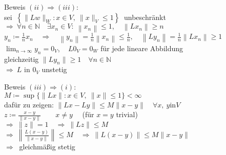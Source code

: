 \documentclass[AERbeamer%
,optBeamerClassicFormat%
,optLeftEquations   %
]{AERlatex}
\begin{document}
%
    \begin{frame}{Beweis}
        \setlength{\baselineskip}{1.6\baselineskip}
%
        $(ii) \Rightarrow (iii)$: \\ \pause
        sei $ ~\left\{\|L w\|_W: x \in V, ~ \|x \|_V \leq 1\right\} ~$ unbeschränkt \\ \pause
        $\Rightarrow ~ \forall n \in \mathbb{N} \quad \exists x_n \in V: ~ \left\|x_n\right\| \leq 1, \quad \left\|L x_n\right\| \geq n$ \\ \pause
        $y_n \coloneqq \frac{1}{n} x_n \quad \Rightarrow \quad \left\|y_n\right\|=\frac{1}{n}\left\|x_n\right\| \leq \frac{1}{n}, \quad \left\|L y_n\right\|=\frac{1}{n}\left\|L x_n\right\| \geq 1$ \\ \pause
        $\lim _{n \rightarrow \infty} y_n=0_V$, ~ $L 0_V=0_W$ für jede lineare Abbildung \\
        gleichzeitig $\|Ly_n\| \geq 1 \quad \forall n \in \mathbb{N}$ \\
        $\Rightarrow ~ L$ in $0_V$ unstetig
    \end{frame}
%
    \begin{frame}{Beweis}
        \setlength{\baselineskip}{1.6\baselineskip}
%
        $(iii) \Rightarrow (i)$: \\
        $M\coloneqq\sup \{\|L x\|: x \in V,~\|x\| \leq 1\}<\infty$ \\ \pause
        dafür zu zeigen: $\|L x-L y\| \leq M\|x-y\| \quad \forall x, ~ y \text{in} V$ \\ \pause
        $z\coloneqq\frac{x-y}{\|x-y\|} \qquad x \neq y \quad$ (für $x=y$ trivial) \\ \pause
        $\Rightarrow ~\|z\|=1 \quad \Rightarrow ~\|L z\| \leq M$ \\ \pause
        $\Rightarrow ~\left\|\frac{L(x-y)}{\|x-y\|}\right\| \leq M \quad \Rightarrow ~\|L(x-y)\| \leq M\|x-y\|$ \\ \pause
        $\Rightarrow ~$ gleichmäßig stetig
    \end{frame}
%
%
\end{document}
